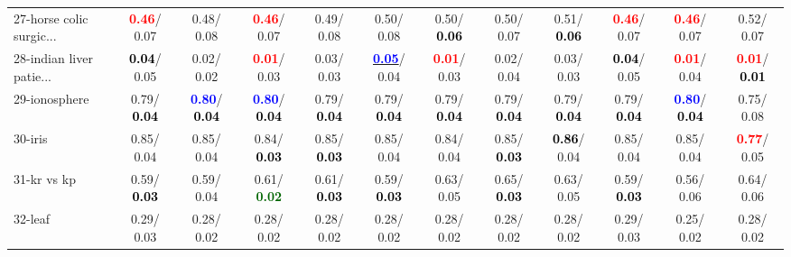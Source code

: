 \begin{table}[h]
\begin{center}
{\begin{tabular}{lc|c|c|c|c|c|c|c|c|c|c}
27-horse colic surgic... & \textcolor{red}{\textbf{  0.46}}/  0.07 &   0.48/  0.08 & \textcolor{red}{\textbf{  0.46}}/  0.07 &   0.49/  0.08 &   0.50/  0.08 &   0.50/\textcolor{black}{\textbf{  0.06}} &   0.50/  0.07 &   0.51/\textcolor{black}{\textbf{  0.06}} & \textcolor{red}{\textbf{  0.46}}/  0.07 & \textcolor{red}{\textbf{  0.46}}/  0.07 &   0.52/  0.07 \\
28-indian liver patie... & \textcolor{black}{\textbf{  0.04}}/  0.05 &   0.02/  0.02 & \textcolor{red}{\textbf{  0.01}}/  0.03 &   0.03/  0.03 & \underline{\textcolor{blue}{\textbf{  0.05}}}/  0.04 & \textcolor{red}{\textbf{  0.01}}/  0.03 &   0.02/  0.04 &   0.03/  0.03 & \textcolor{black}{\textbf{  0.04}}/  0.05 & \textcolor{red}{\textbf{  0.01}}/  0.04 & \textcolor{red}{\textbf{  0.01}}/\textcolor{black}{\textbf{  0.01}} \\ \hline
29-ionosphere &   0.79/\textcolor{black}{\textbf{  0.04}} & \textcolor{blue}{\textbf{  0.80}}/\textcolor{black}{\textbf{  0.04}} & \textcolor{blue}{\textbf{  0.80}}/\textcolor{black}{\textbf{  0.04}} &   0.79/\textcolor{black}{\textbf{  0.04}} &   0.79/\textcolor{black}{\textbf{  0.04}} &   0.79/\textcolor{black}{\textbf{  0.04}} &   0.79/\textcolor{black}{\textbf{  0.04}} &   0.79/\textcolor{black}{\textbf{  0.04}} &   0.79/\textcolor{black}{\textbf{  0.04}} & \textcolor{blue}{\textbf{  0.80}}/\textcolor{black}{\textbf{  0.04}} &   0.75/  0.08 \\
30-iris &   0.85/  0.04 &   0.85/  0.04 &   0.84/\textcolor{black}{\textbf{  0.03}} &   0.85/\textcolor{black}{\textbf{  0.03}} &   0.85/  0.04 &   0.84/  0.04 &   0.85/\textcolor{black}{\textbf{  0.03}} & \textcolor{black}{\textbf{  0.86}}/  0.04 &   0.85/  0.04 &   0.85/  0.04 & \textcolor{red}{\textbf{  0.77}}/  0.05 \\
31-kr vs kp &   0.59/\textcolor{black}{\textbf{  0.03}} &   0.59/  0.04 &   0.61/\textcolor{darkgreen}{\textbf{  0.02}} &   0.61/\textcolor{black}{\textbf{  0.03}} &   0.59/\textcolor{black}{\textbf{  0.03}} &   0.63/  0.05 &   0.65/\textcolor{black}{\textbf{  0.03}} &   0.63/  0.05 &   0.59/\textcolor{black}{\textbf{  0.03}} &   0.56/  0.06 &   0.64/  0.06 \\
32-leaf &   0.29/  0.03 &   0.28/  0.02 &   0.28/  0.02 &   0.28/  0.02 &   0.28/  0.02 &   0.28/  0.02 &   0.28/  0.02 &   0.28/  0.02 &   0.29/  0.03 &   0.25/  0.02 &   0.28/  0.02 \\\end{tabular}
}\label{strats0aSVM}
\end{center}
\end{table}
